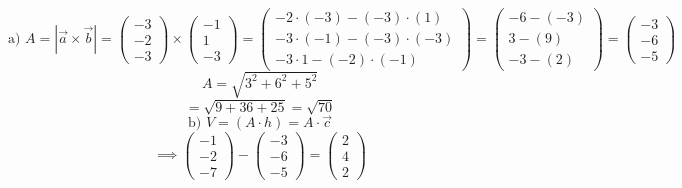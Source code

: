 \documentclass{article}
\begin{document}
\[ \text{a) } A = | \vec{a} \times \vec{b} | = \begin{pmatrix} -3 \\ -2 \\ -3 \end{pmatrix} \times \begin{pmatrix} -1 \\ 1 \\ -3 \end{pmatrix} = \begin{pmatrix} -2 \cdot (-3) - (-3) \cdot (1) \\ -3 \cdot (-1) - (-3) \cdot (-3) \\ -3 \cdot 1 - (-2) \cdot (-1) \end{pmatrix} = \begin{pmatrix} -6 - (-3) \\ 3 - (9) \\ -3 - (2) \end{pmatrix} = \begin{pmatrix} -3 \\ -6 \\ -5 \end{pmatrix} \]
\[ A = \sqrt{3^2+6^2+5^2} \]
\[ = \sqrt{9+36+25} = \sqrt{70} \]
\[ \text{b) } V = (A \cdot h) = A \cdot \vec{c} \]
\[ \implies \begin{pmatrix} -1 \\ -2 \\ -7 \end{pmatrix} - \begin{pmatrix} -3 \\ -6 \\ -5 \end{pmatrix} = \begin{pmatrix} 2 \\ 4 \\ 2 \end{pmatrix} \]
\end{document}
